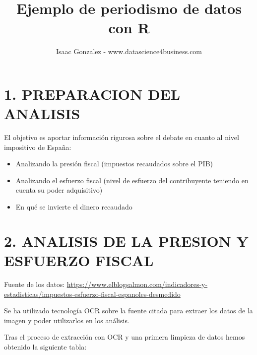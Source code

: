 \documentclass[
]{article}
\title{Ejemplo de periodismo de datos con R}
\author{Isaac Gonzalez - www.datascience4business.com}
\date{}
\providecommand{\tightlist}{%
  \setlength{\itemsep}{0pt}\setlength{\parskip}{0pt}}
\begin{document}
\maketitle

\hypertarget{preparacion-del-analisis}{%
\section{1. PREPARACION DEL ANALISIS}\label{preparacion-del-analisis}}

El objetivo es aportar información rigurosa sobre el debate en cuanto al
nivel impositivo de España:

\begin{itemize}
\tightlist
\item
  Analizando la presión fiscal (impuestos recaudados sobre el PIB)
\item
  Analizando el esfuerzo fiscal (nivel de esfuerzo del contribuyente
  teniendo en cuenta su poder adquisitivo)
\item
  En qué se invierte el dinero recaudado
\end{itemize}

\hypertarget{analisis-de-la-presion-y-esfuerzo-fiscal}{%
\section{2. ANALISIS DE LA PRESION Y ESFUERZO
FISCAL}\label{analisis-de-la-presion-y-esfuerzo-fiscal}}

Fuente de los datos:
\url{https://www.elblogsalmon.com/indicadores-y-estadisticas/impuestos-esfuerzo-fiscal-espanoles-desmedido}

Se ha utilizado tecnología OCR sobre la fuente citada para extraer los
datos de la imagen y poder utilizarlos en los análisis.

Tras el proceso de extracción con OCR y una primera limpieza de datos
hemos obtenido la siguiente tabla:
\end{document}
